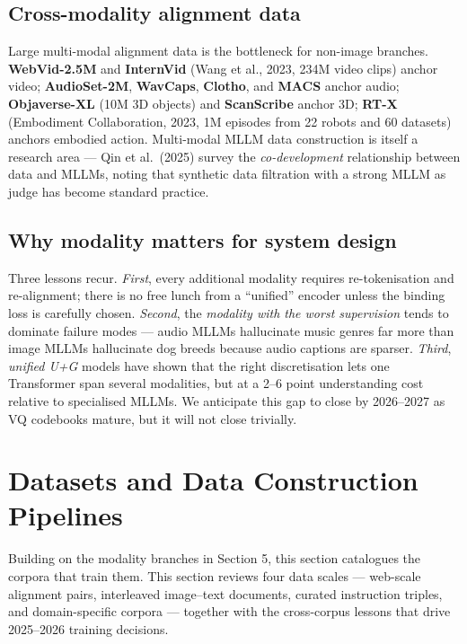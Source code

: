 \subsection{Cross-modality alignment data}\label{cross-modality-alignment-data}

Large multi-modal alignment data is the bottleneck for non-image branches. \textbf{WebVid-2.5M} and \textbf{InternVid} (Wang et al., 2023, 234M video clips) anchor video; \textbf{AudioSet-2M}, \textbf{WavCaps}, \textbf{Clotho}, and \textbf{MACS} anchor audio; \textbf{Objaverse-XL} (10M 3D objects) and \textbf{ScanScribe} anchor 3D; \textbf{RT-X} (Embodiment Collaboration, 2023, 1M episodes from 22 robots and 60 datasets) anchors embodied action. Multi-modal MLLM data construction is itself a research area --- Qin et al.~(2025) survey the \emph{co-development} relationship between data and MLLMs, noting that synthetic data filtration with a strong MLLM as judge has become standard practice.

\subsection{Why modality matters for system design}\label{why-modality-matters-for-system-design}

Three lessons recur. \emph{First}, every additional modality requires re-tokenisation and re-alignment; there is no free lunch from a ``unified'' encoder unless the binding loss is carefully chosen. \emph{Second}, the \emph{modality with the worst supervision} tends to dominate failure modes --- audio MLLMs hallucinate music genres far more than image MLLMs hallucinate dog breeds because audio captions are sparser. \emph{Third}, \emph{unified U+G} models have shown that the right discretisation lets one Transformer span several modalities, but at a 2--6 point understanding cost relative to specialised MLLMs. We anticipate this gap to close by 2026--2027 as VQ codebooks mature, but it will not close trivially.

\section{Datasets and Data Construction Pipelines}\label{datasets-and-data-construction-pipelines}

Building on the modality branches in Section 5, this section catalogues the corpora that train them. This section reviews four data scales --- web-scale alignment pairs, interleaved image--text documents, curated instruction triples, and domain-specific corpora --- together with the cross-corpus lessons that drive 2025--2026 training decisions.

